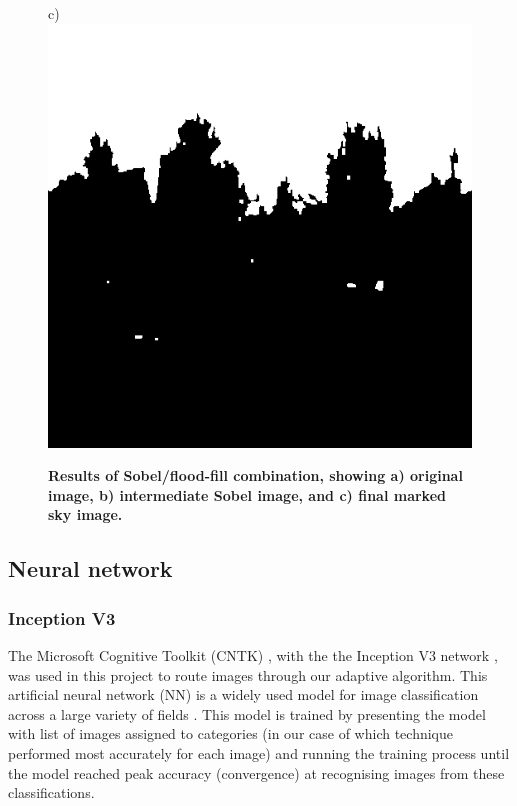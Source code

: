 \documentclass[final,3p,times,authoryear]{elsarticle}
\begin{document}
\begin{figure}
c)\includegraphics[scale=0.20]{Images/FloodfillOutput.png}
\caption{\bf   Results of Sobel/flood-fill combination, showing a) original image, b) intermediate Sobel image, and c) final marked sky image.}    
 \label{fig:sobelflood}  
\end{figure} 

\subsection{Neural network}\label{sec:nn}

\subsubsection{Inception V3}\label{sec:inception}
The Microsoft Cognitive Toolkit (CNTK) \citep{Yu2015,Agarwal2016}, with the the Inception V3 network \citep{Szegedy2015a}, was used in this project to route images through our adaptive algorithm. This artificial neural network (NN) is a widely used model for image classification across a large variety of fields \citep{Xia2017,Hassannejad2016}. This model is trained by presenting the model with list of images assigned to categories (in our case of which technique performed most accurately for each image) and running the training process until the model reached peak accuracy (convergence) at recognising images from these classifications.
\end{document}
